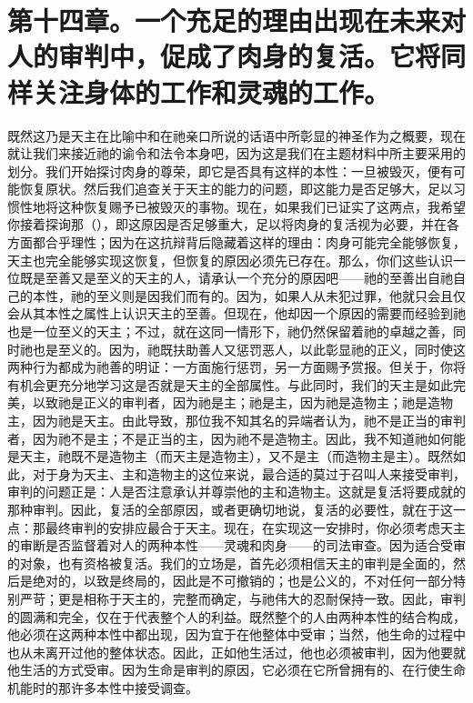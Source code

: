 
\section{第十四章。一个充足的理由出现在未来对人的审判中，促成了肉身的复活。它将同样关注身体的工作和灵魂的工作。}

既然这乃是天主在比喻中和在祂亲口所说的话语中所彰显的神圣作为之概要，现在就让我们来接近祂的谕令和法令本身吧，因为这是我们在主题材料中所主要采用的划分。我们开始探讨肉身的尊荣，即它是否具有这样的本性：一旦被毁灭，便有可能恢复原状。然后我们追查关于天主的能力的问题，即这能力是否足够大，足以习惯性地将这种恢复赐予已被毁灭的事物。现在，如果我们已证实了这两点，我希望你接着探询那（），即这原因是否足够重大，足以将肉身的复活视为必要，并在各方面都合乎理性；因为在这抗辩背后隐藏着这样的理由：肉身可能完全能够恢复，天主也完全能够实现这恢复，但恢复的原因必须先已存在。那么，你们这些认识一位既是至善又是至义的天主的人，请承认一个充分的原因吧——祂的至善出自祂自己的本性，祂的至义则是因我们而有的。因为，如果人从未犯过罪，他就只会且仅会从其本性之属性上认识天主的至善。但现在，他却因一个原因的需要而经验到祂也是一位至义的天主；不过，就在这同一情形下，祂仍然保留着祂的卓越之善，同时祂也是至义的。因为，祂既扶助善人又惩罚恶人，以此彰显祂的正义，同时使这两种行为都成为祂善的明证：一方面施行惩罚，另一方面赐予赏报。但关于，你将有机会更充分地学习这是否就是天主的全部属性。与此同时，我们的天主是如此完美，以致祂是正义的审判者，因为祂是主；祂是主，因为祂是造物主；祂是造物主，因为祂是天主。由此导致，那位我不知其名的异端者认为，祂不是正当的审判者，因为祂不是主；不是正当的主，因为祂不是造物主。因此，我不知道祂如何能是天主，祂既不是造物主（而天主是造物主），又不是主（而造物主是主）。既然如此，对于身为天主、主和造物主的这位来说，最合适的莫过于召叫人来接受审判，审判的问题正是：人是否注意承认并尊崇他的主和造物主。这就是复活将要成就的那种审判。因此，复活的全部原因，或者更确切地说，复活的必要性，就在于这一点：那最终审判的安排应最合于天主。现在，在实现这一安排时，你必须考虑天主的审断是否监督着对人的两种本性——灵魂和肉身——的司法审查。因为适合受审的对象，也有资格被复活。我们的立场是，首先必须相信天主的审判是全面的，然后是绝对的，以致是终局的，因此是不可撤销的；也是公义的，不对任何一部分特别严苛；更是相称于天主的，完整而确定，与祂伟大的忍耐保持一致。因此，审判的圆满和完全，仅在于代表整个人的利益。既然整个的人由两种本性的结合构成，他必须在这两种本性中都出现，因为宜于在他整体中受审；当然，他生命的过程中也从未离开过他的整体状态。因此，正如他生活过，他也必须被审判，因为他要就他生活的方式受审。因为生命是审判的原因，它必须在它所曾拥有的、在行使生命机能时的那许多本性中接受调查。\par

